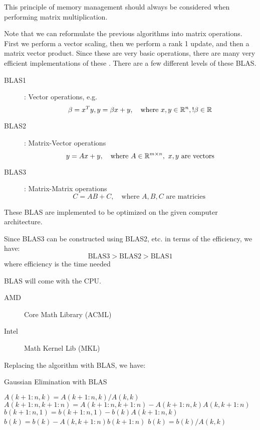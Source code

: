 \documentclass[../main/main.tex]{subfiles}
\begin{document}
\begin{remark}
This principle of memory management should always be considered when performing matrix multiplication.
\end{remark}
Note that we can reformulate the previous algorithms into matrix operations. First we perform a vector scaling, then we perform a rank 1 update, and then a matrix vector product. Since these are very basic operations, there are many very efficient implementations of these . There are a few different levels of these BLAS.
\begin{description}
  \item[BLAS1]: Vector operations, e.g. \[
        \beta = x^{T} y, y = \beta x +y,\quad \text{where }x,y \in \mathbb{R}^{n},! \beta \in \mathbb{R}
        \]
  \item[BLAS2]: Matrix-Vector operations \[
        y = Ax + y, \quad \text{where }A\in \mathbb{R}^{m \times n},~ x,y\text{ are vectors}
        \]
  \item[BLAS3]: Matrix-Matrix operations \[
        C = AB + C, \quad \text{where }A,B,C \text{ are matricies }
        \]
\end{description}
These BLAS are implemented to be optimized on the given computer architecture.
\begin{remark}
  Since BLAS3 can be constructed using BLAS2, etc. in terms of the efficiency, we have: \[
    \text{BLAS3} > \text{BLAS2} > \text{BLAS1}
  \]where efficiency is the time needed
\end{remark}
\begin{remark}
BLAS will come with the CPU.
\begin{description}
  \item[AMD] Core Math Library (ACML)
\item[Intel] Math Kernel Lib (MKL)
\end{description}
\end{remark}
Replacing the algorithm with BLAS, we have:

        	\begin{algorithm}[h!]
	\caption{Gaussian Elimination with BLAS}
	\begin{algorithmic}[1]
      \State $A(k+1:n,k)=A(k+1:n,k) / A(k,k)$
      \State $A(k+1:n,k+1:n)=A(k+1:n,k+1:n) - A(k+1:n,k)A(k,k+1:n)$
      \State $b(k+1:n,1)= b(k+1:n,1) - b(k)A(k+1:n,k)$
      \EndFor
      \State $b(k) = b(k) - A(k,k+1:n)b(k+1:n)$
      \State $b(k) = b(k)  / A(k,k)$
      \EndFor
	\end{algorithmic}
	\end{algorithm}
\end{document}
